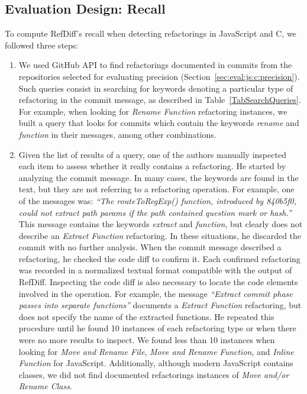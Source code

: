 \subsection{Evaluation Design: Recall}
\label{sec:eval:js:c:recall}


To compute RefDiff's recall when detecting refactorings in JavaScript and C, we followed three steps:

\begin{enumerate}  
\item We used GitHub API to find refactorings documented in commits from the repositories selected for evaluating precision (Section~\ref{sec:eval:js:c:precision}). Such queries consist in searching for keywords denoting a particular type of refactoring in the commit message, as described in Table~\ref{TabSearchQueries}. For example, when looking for \emph{Rename Function} refactoring instances, we built a query that looks for commits which contain the keywords \textit{rename} and \textit{function} in their messages, among other combinations.

\item Given the list of results of a query, one of the authors manually inspected each item to assess whether it really contains a refactoring. He started by analyzing the commit message. 
In many cases, the keywords are found in the text, but they are not referring to a refactoring operation.
For example, one of the messages was: \textit{``The routeToRegExp() function, introduced by 840b5f0, could not extract path params if the path contained question mark or hash.''}
This message contains the keywords \textit{extract} and \textit{function}, but clearly does not describe an \emph{Extract Function} refactoring.
In these situations, he discarded the commit with no further analysis.
When the commit message described a refactoring, he checked the code diff to confirm it.
Each confirmed refactoring was recorded in a normalized textual format compatible with the output of RefDiff.
Inspecting the code diff is also necessary to locate the code elements involved in the operation.
For example, the message \textit{``Extract commit phase passes into separate functions''} documents a \emph{Extract Function} refactoring, but does not specify the name of the extracted functions.
He repeated this procedure until he found 10 instances of each refactoring type or when there were no more results to inspect. We found less than 10 instances when looking for \emph{Move and Rename File}, \emph{Move and Rename Function}, and \emph{Inline Function} for JavaScript. Additionally, although modern JavaScript contains classes, we did not find documented refactorings instances of \emph{Move and/or Rename Class}.




\end{enumerate}
